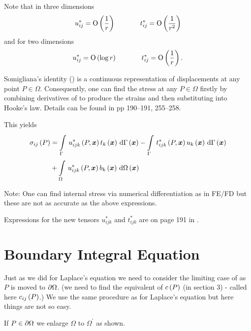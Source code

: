 Note that in three dimensions
\begin{displaymath}
  u_{ij}^{*} =  \mathrm{O}\left( \frac{1}{r} \right) \hspace{0.5in} t_{ij}^{*} = 
   \mathrm{O}\left( \frac{1}{r^{2}} \right) 
\end{displaymath}
 and for two dimensions
\begin{displaymath}
  u_{ij}^{*} =  \mathrm{O}\left( \log r \right) \hspace{0.5in}  t_{ij}^{*} =  \mathrm{O}\left( \frac{1}{r} \right) .
\end{displaymath}


Somigliana's identity () is a continuous representation of
displacements at any point $P \in \Omega$.  Consequently, one can find the
stress at any $P \in \Omega$ firstly by combining derivatives of
 to produce the strains and then substituting into Hooke's law.
Details can be found in  pp 190--191, 255--258.

This yields
\begin{align*}
  \fnof{\sigma_{ij}}{P} &= \gint{\Gamma}{}{\fnof{u_{ijk}^{*}}{P,\vectr{x}}
    \fnof{t_{k}}{\vectr{x}}}{\fnof{\Gamma}{\vectr{x}}} -
    \gint{\Gamma}{}{\fnof{t_{ijk}^{*}}{P,\vectr{x}}
    \fnof{u_{k}}{\vectr{x}}}{\fnof{\Gamma}{\vectr{x}}} \\ 
  &+ \gint{\Omega}{}{\fnof{u_{ijk}^{*}}{P,\vectr{x}}
    \fnof{b_{k}}{\vectr{x}}}{\fnof{\Omega}{\vectr{x}}}
\end{align*}

Note: One can find internal stress via numerical differentiation as in FE/FD
but these are not as accurate as the above expressions.

Expressions for the new tensors $ u_{ijk}^{*}$ and $t_{ijk}^{*}$ are on page
191 in \cite{brebbia:1984}.

\section{Boundary Integral Equation}
\label{sec:BIE,sec4.10}

Just as we did for Laplace's equation we need to consider the limiting case of
 as $P$ is moved to $\partial \Omega$. (\ie we need to find the
equivalent of $ c\left( P \right) $ (in section 3) - called here $ c_{ij}\left( P \right) $.)
We use the same procedure as for Laplace's equation but here things are not so
easy.

If  $P \in \partial \Omega$ we enlarge $\Omega$ to $\Omega^{\prime}$ as 
shown.

